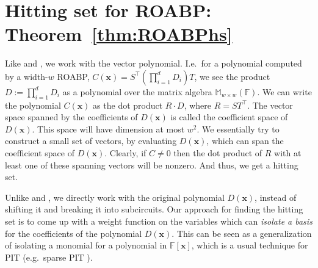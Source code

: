 \documentclass[final,oneeqnum, onethmnum, onefignum]{siamltex1213}
\newcommand{\Mat}{\mathbb M}
\newcommand{\F}{\mathbb F}
\newcommand{\x}{\mathbf{x}}
\begin{document}
\section{Hitting set for ROABP: Theorem~\ref{thm:ROABPhs}}
\label{sec:ROABP}
Like \cite{ASS13} and \cite{FSS13}, we work with the vector polynomial.
I.e.\ for a polynomial computed by a width-$w$ ROABP, 
$C(\mathbf{x}) = S^{\top} (\prod_{i=1}^d D_i) T$, we see the product
$D := \prod_{i=1}^d D_i$ as a polynomial over the matrix algebra $\Mat_{w \times w}(\F)$.
We can write the polynomial $C(\mathbf{x})$ as the dot product
$R \cdot D$, where $R = ST^{\top}$.
The vector space spanned by the coefficients of $D(\mathbf{x})$ is called
the coefficient space of $D(\mathbf{x})$.
This space will have dimension at most $w^2$. 
We essentially try to construct a small set of vectors, by evaluating $D(\mathbf{x})$,
 which can span
the coefficient space of $D(\mathbf{x})$.  
Clearly, if $C \neq 0$ then the dot product of $R$ with at least one of these 
spanning vectors will be nonzero. 
And thus, we get a hitting set.

Unlike \cite{ASS13} and \cite{FSS13}, we directly work with the original 
polynomial $D(\x)$, instead of shifting it and breaking it into subcircuits. 
Our approach for finding the hitting set is to come up with a weight function
on the variables which can {\em isolate a basis}
for the coefficients of the polynomial $D(\x)$. 
This can be seen as a generalization of isolating a monomial for a polynomial in 
$\F[\mathbf{x}]$, which is a usual technique for PIT (e.g.\ sparse PIT \cite{KS01}).
\end{document}
